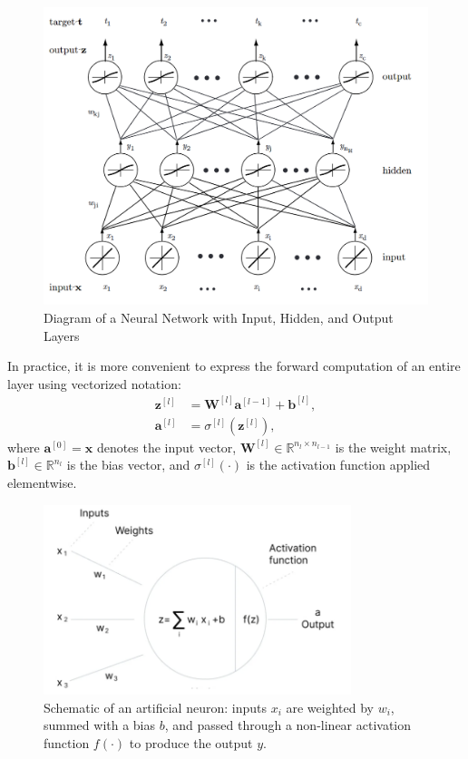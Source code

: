     \newpage
    \begin{figure}
    \centering
    \includegraphics[width=1\textwidth]{figuras/2-fundamentos/neuralNetworkStructure.png}
    \caption{Diagram of a Neural Network with Input, Hidden, and Output Layers \cite{duda2001pattern}}
    \label{fig:neural_network_architecture}
    \end{figure}

    
    
    In practice, it is more convenient to express the forward computation of an entire layer using vectorized notation:
    \begin{align}
        \mathbf{z}^{[l]} &= \mathbf{W}^{[l]} \mathbf{a}^{[l-1]} + \mathbf{b}^{[l]}, \\
        \mathbf{a}^{[l]} &= \sigma^{[l]}\left( \mathbf{z}^{[l]} \right),
        \end{align}
where $\mathbf{a}^{[0]} = \mathbf{x}$ denotes the input vector, $\mathbf{W}^{[l]} \in \mathbb{R}^{n_l \times n_{l-1}}$ is the weight matrix, $\mathbf{b}^{[l]} \in \mathbb{R}^{n_l}$ is the bias vector, and $\sigma^{[l]}(\cdot)$ is the activation function applied elementwise.

\begin{figure}[H]
    \centering
    \includegraphics[width=0.8\textwidth]{figuras/2-fundamentos/neural_node.png}
    \caption{Schematic of an artificial neuron: inputs $x_i$ are weighted by $w_i$, summed with a bias $b$, and passed through a non-linear activation function $f(\cdot)$ to produce the output $y$.}
    \label{fig:neuron_diagram}
    \end{figure}

